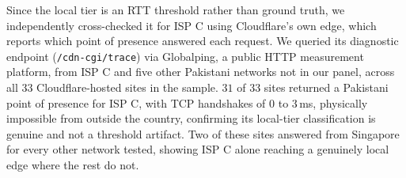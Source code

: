 \documentclass[sigconf,anonymous,10pt]{acmart}
\begin{document}
Since the local tier is an RTT threshold rather than ground truth, we independently cross-checked it for ISP C using Cloudflare's own edge, which reports which point of presence answered each request. We queried its diagnostic endpoint (\texttt{/cdn-cgi/trace}) via Globalping, a public HTTP measurement platform, from ISP C and five other Pakistani networks not in our panel, across all $33$ Cloudflare-hosted sites in the sample. $31$ of $33$ sites returned a Pakistani point of presence for ISP C, with TCP handshakes of 0 to $3$\,ms, physically impossible from outside the country, confirming its local-tier classification is genuine and not a threshold artifact. Two of these sites answered from Singapore for every other network tested, showing ISP C alone reaching a genuinely local edge where the rest do not.






\end{document}
